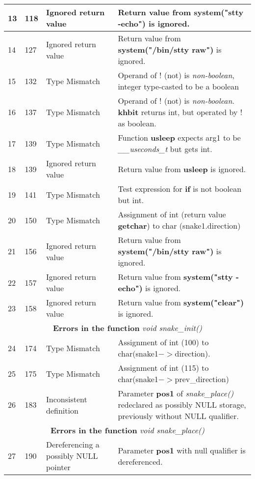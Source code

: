 \documentclass[]{article}
\begin{document}
\begin{longtable}{ |p{0.5cm}|p{0.75cm}|p{3cm}|p{7cm}|  }
		\hline 
		13 & 118 & Ignored return value & Return value from \textbf{system("stty -echo")} is ignored.\\ 
		\hline 
		14 & 127 & Ignored return value & Return value from \textbf{system("/bin/stty raw")} is ignored.\\
		\hline 
		15 & 132 & Type Mismatch & Operand of ! (not) is \textit{non-boolean}, integer type-casted to be a boolean \\
		\hline
		16 & 137 & Type Mismatch & Operand of ! (not) is \textit{non-boolean}. \textbf{khbit} returns int, but operated by ! as boolean. \\
		\hline 
		17 & 139 & Type Mismatch & Function \textbf{usleep} expects arg1 to be \textit{\_\_useconds\_t} but gets int. \\
		\hline 
		18 & 139 & Ignored return value & Return value from \textbf{usleep} is ignored. \\
		\hline 
		19 & 141 & Type Mismatch & Test expression for \textbf{if} is not boolean but int. \\ 
		\hline 
		20 & 150 & Type Mismatch & Assignment of int (return value \textbf{getchar}) to char (snake1.direction) \\
		\hline 
		21 & 156 & Ignored return value & Return value from \textbf{system("/bin/stty raw")} is ignored. \\
		\hline 
		22 & 157 & Ignored return value & Return value from \textbf{system("stty -echo")} is ignored. \\
		\hline 
		23 & 158 & Ignored return value & Return value from \textbf{system("clear")} is ignored. \\
		\hline 
		\multicolumn{4}{|c|}{\textbf{Errors in the function} \textit{void snake\_init()}} \\
		\hline 
		24 & 174 & Type Mismatch & Assignment of int (100) to char(snake1$->$direction). \\
		\hline 
		25 & 175 & Type Mismatch & Assignment of int (115) to char(snake1$->$prev\_direction) \\
		\hline 
		26 & 183 & Inconsistent definition & Parameter \textbf{pos1} of \textit{snake\_place()} redeclared as possibly NULL storage, previously without NULL qualifier. \\
		\hline 
		\multicolumn{4}{|c|}{\textbf{Errors in the function} \textit{void snake\_place()}} \\
		\hline 
		27 & 190 & Dereferencing a possibly NULL pointer & Parameter \textbf{pos1} with null qualifier is dereferenced. \\

\end{longtable}
\end{document}
